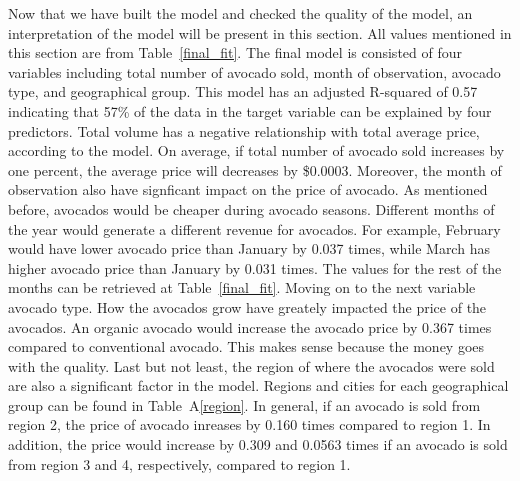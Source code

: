 \documentclass[11pt]{article}\usepackage[]{graphicx}\usepackage[]{color}
\begin{document}
\noindent Now that we have built the model and checked the quality of the model, an interpretation of the model will be present in this section. All values mentioned in this section are from Table~\ref{final_fit}. The final model is consisted of four variables including total number of avocado sold, month of observation, avocado type, and geographical group. This model has an adjusted R-squared of 0.57 indicating that 57\% of the data in the target variable can be explained by four predictors. Total volume has a negative relationship with total average price, according to the model. On average, if total number of avocado sold increases by one percent, the average price will decreases by \$0.0003. Moreover, the month of observation also have signficant impact on the price of avocado. As mentioned before, avocados would be cheaper during avocado seasons. Different months of the year would generate a different revenue for avocados. For example, February would have lower avocado price than January by 0.037 times, while March has higher avocado price than January by 0.031 times. The values for the rest of the months can be retrieved at Table~\ref{final_fit}. Moving on to the next variable avocado type. How the avocados grow have greately impacted the price of the avocados. An organic avocado would increase the avocado price by 0.367 times compared to conventional avocado. This makes sense because the money goes with the quality. Last but not least, the region of where the avocados were sold are also a significant factor in the model. Regions and cities for each geographical group can be found in Table~A\ref{region}. In general, if an avocado is sold from region 2, the price of avocado inreases by 0.160 times compared to region 1. In addition, the price would increase by 0.309 and 0.0563 times if an avocado is sold from region 3 and 4, respectively, compared to region 1.
\hfill \break
\end{document}
